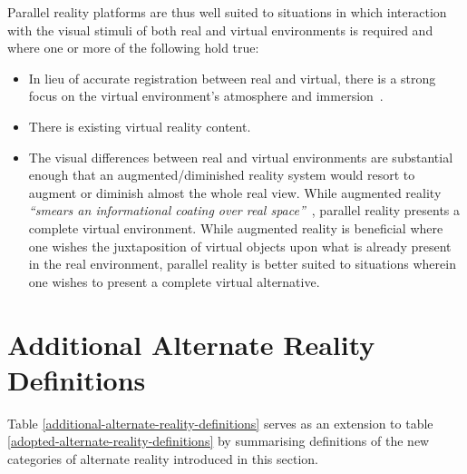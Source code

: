 Parallel reality platforms are thus well suited to situations in which interaction with the visual stimuli of both real and virtual environments is required and where one or more of the following hold true:

\begin{itemize}
	\item In lieu of accurate registration between real and virtual, there is a strong focus on the virtual environment's atmosphere and immersion~\cite{deamicis:gamebased}.
	\item There is existing virtual reality content.
	\item The visual differences between real and virtual environments are substantial enough that an augmented/diminished reality system would resort to augment or diminish almost the whole real view. While augmented reality \textit{``smears an informational coating over real space''}~\cite{Andersen}, parallel reality presents a complete virtual environment. While augmented reality is beneficial where one wishes the juxtaposition of virtual objects upon what is already present in the real environment, parallel reality is better suited to situations wherein one wishes to present a complete virtual alternative.
\end{itemize}


\section{Additional Alternate Reality Definitions}
\label{summaryofadditionalalternaterealitydefinitions}

Table \ref{additional-alternate-reality-definitions} serves as an extension to table \ref{adopted-alternate-reality-definitions} by summarising definitions of the new categories of alternate reality introduced in this section.

